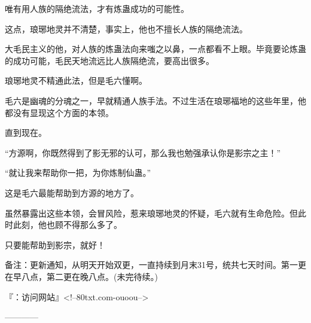\begin{this_body}
唯有用人族的隔绝流法，才有炼蛊成功的可能性。

这点，琅琊地灵并不清楚，事实上，他也不擅长人族的隔绝流法。

大毛民主义的他，对人族的炼蛊法向来嗤之以鼻，一点都看不上眼。毕竟要论炼蛊的成功可能，毛民天地流远比人族隔绝流，要高出很多。

琅琊地灵不精通此法，但是毛六懂啊。

毛六是幽魂的分魂之一，早就精通人族手法。不过生活在琅琊福地的这些年里，他都没有显现这个方面的本领。

直到现在。

“方源啊，你既然得到了影无邪的认可，那么我也勉强承认你是影宗之主！”

“就让我来帮助你一把，为你炼制仙蛊。”

这是毛六最能帮助到方源的地方了。

虽然暴露出这些本领，会冒风险，惹来琅琊地灵的怀疑，毛六就有生命危险。但此时此刻，他也顾不得那么多了。

只要能帮助到影宗，就好！

备注：更新通知，从明天开始双更，一直持续到月末31号，统共七天时间。第一更在早八点，第二更在晚八点。(未完待续。)

『：访问网站』<!--80txt.com-ouoou-->

------------

\end{this_body}

